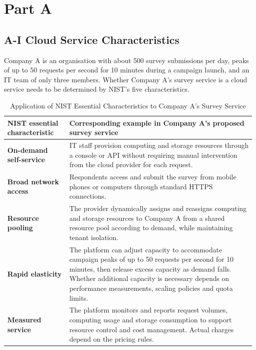\section{Part A}

\subsection{A-I Cloud Service Characteristics}
Company A is an organisation with about 500 survey submissions per day, peaks of up to 50 requests per second for 10 minutes during a campaign launch, and an IT team of only three members. Whether Company A's survey service is a cloud service needs to be determined by NIST's five characteristics\parencite{nist2011}.




\begin{table}[htbp]
\centering

\begin{tabularx}{\textwidth}{
    @{}
    >{\raggedright\arraybackslash}p{}
    >{\raggedright\arraybackslash}X
    @{}
}
\toprule
\textbf{NIST essential characteristic}
&
\textbf{Corresponding example in Company A's proposed survey service}
\\
\midrule

\textbf{On-demand self-service}
&
IT staff provision computing and storage resources through a
console or API without requiring manual intervention from the
cloud provider for each request.
\\
\addlinespace

\textbf{Broad network access}
&
Respondents access and submit the survey from mobile phones or
computers through standard HTTPS connections.
\\
\addlinespace

\textbf{Resource pooling}
&
The provider dynamically assigns and reassigns computing and
storage resources to Company A from a shared resource pool
according to demand, while maintaining tenant isolation.
\\
\addlinespace

\textbf{Rapid elasticity}
&
The platform can adjust capacity to accommodate campaign peaks
of up to 50 requests per second for 10 minutes, then release
excess capacity as demand falls. Whether additional capacity is
necessary depends on performance measurements, scaling policies
and quota limits.
\\
\addlinespace

\textbf{Measured service}
&
The platform monitors and reports request volumes, computing
usage and storage consumption to support resource control and
cost management. Actual charges depend on the pricing rules.
\\

\bottomrule
\end{tabularx}
\caption{Application of NIST Essential Characteristics to Company A's Survey Service}
\label{tab:nist-characteristics}
\end{table}
\medskip

